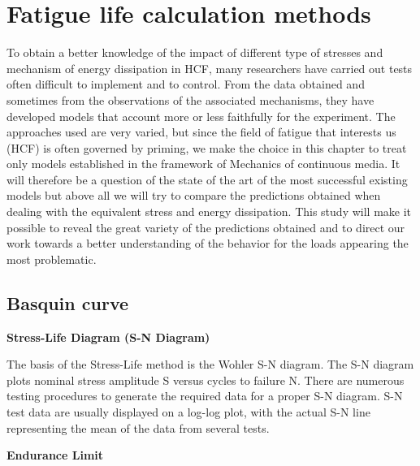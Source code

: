 \chapter{Fatigue life calculation methods}\label{chp:2}
\minitoc

To obtain a better knowledge of the impact of different type of stresses and mechanism of energy dissipation in HCF, many researchers have carried out tests often difficult to implement and to control. From the data obtained and sometimes from the observations of the associated mechanisms, they have developed models that account more or less faithfully for the experiment. The approaches used are very varied, but since the field of fatigue that interests us (HCF) is often governed by priming, we make the choice in this chapter to treat only models established in the framework of Mechanics of continuous media. It will therefore be a question of the state of the art of the most successful existing models but above all we will try to compare the predictions obtained when dealing with the equivalent stress and energy dissipation. This study will make it possible to reveal the great variety of the predictions obtained and to direct our work towards a better understanding of the behavior for the loads appearing the most problematic.



\section{Basquin curve}

\vspace{6pt}
\textbf{Stress-Life Diagram (S-N Diagram)}

The basis of the Stress-Life method is the Wohler S-N diagram. The S-N diagram plots nominal stress amplitude S versus cycles to
failure N. There are numerous testing procedures to generate the required data for a proper
S-N diagram. S-N test data are usually displayed on a log-log plot, with the actual S-N line
representing the mean of the data from several tests.

\textbf{Endurance Limit}

